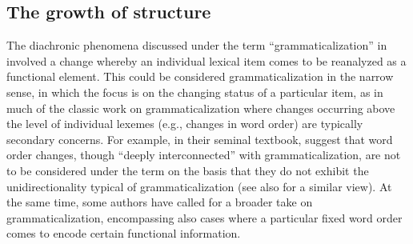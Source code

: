 \documentclass[output=paper,hidelinks]{langscibook}
\begin{document}

 
\subsection{The growth of structure}
\label{subsect:growth}

The diachronic phenomena discussed under the term ``grammaticalization'' in  involved a change whereby an individual lexical item comes to be reanalyzed as a functional element. This could be considered grammaticalization in the narrow sense, in which the focus is on the changing status of a particular item, as in much of the classic work on grammaticalization where changes occurring above the level of individual lexemes (e.g., changes in word order) are typically secondary concerns. For example, in their seminal textbook, \citet[24, 59]{hopper_traugott_2003} suggest that word order changes, though ``deeply interconnected'' with grammaticalization, are not to be considered under the term on the basis that they do not exhibit the unidirectionality typical of grammaticalization (see also \citealp{sun2011grammaticalization} for a similar view).  
At the same time, some authors have called for a broader take on grammaticalization, encompassing also cases where a particular fixed word order comes to encode certain functional information. 
\end{document}
